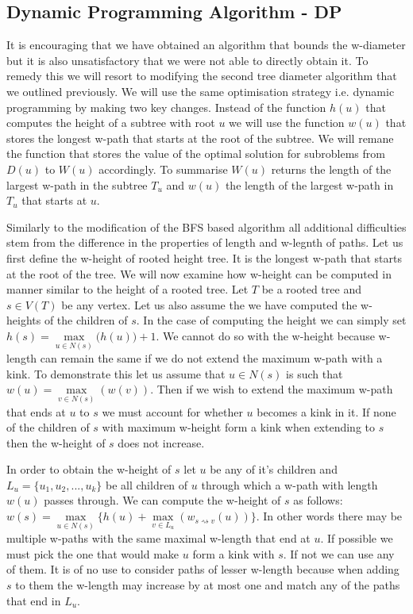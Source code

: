 \subsection{Dynamic Programming Algorithm - DP}


It is encouraging that we have obtained an algorithm that bounds the w-diameter but it is also unsatisfactory that we were not able to directly obtain it. To remedy this we will resort to modifying the second tree diameter algorithm that we outlined previously. We will use the same optimisation strategy i.e. dynamic programming by making two key changes. Instead of the function $h(u)$ that computes the height of a subtree with root $u$ we will use the function $w(u)$ that stores the longest w-path that starts at the root of the subtree. We will remane the function that stores the value of the optimal solution for subroblems from $D(u)$ to $W(u)$ accordingly. To summarise $W(u)$ returns the length of the largest w-path in the subtree $T_u$ and $w(u)$ the length of the largest w-path in $T_u$ that starts at $u$.

Similarly to the modification of the BFS based algorithm all additional difficulties stem from the difference in the properties of length and w-legnth of paths. Let us first define the w-height of rooted height tree. It is the longest w-path that starts at the root of the tree. We will now examine how w-height can be computed in manner similar to the height of a rooted tree. Let $T$ be a rooted tree and $s \in V(T)$ be any vertex. Let us also assume the we have computed the w-heights of the children of $s$. In the case of computing the height we can simply set $h(s) = \max\limits_{u \in N(s)}\big( h(u) \big) + 1$. We cannot do so with the w-height because w-length can remain the same if we do not extend the maximum w-path with a kink.  To demonstrate this let us assume that $u \in N(s)$ is such that $w(u) = \max\limits_{v \in N(s)}(w(v))$. Then if we wish to extend the maximum w-path that ends at $u$ to $s$ we must account for whether $u$ becomes a kink in it. If none of the children of $s$ with maximum w-height form a kink when extending to $s$ then the w-height of $s$ does not increase.

In order to obtain the w-height of $s$ let $u$ be any of it's children and $L_u = \{u_1, u_2, ..., u_k\}$ be all children of $u$ through which a w-path with length $w(u)$ passes through. We can compute the w-height of $s$ as follows: $w(s) = \max\limits_{u \in N(s)}\{ h(u) + \max\limits_{v \in L_u}(w_{s \rightsquigarrow v}(u)) \}$. In other words there may be multiple w-paths with the same maximal w-length that end at $u$. If possible we must pick the one that would make $u$ form a kink with $s$. If not we can use any of them. It is of no use to consider paths of lesser w-length because when adding $s$ to them the w-length may increase by at most one and match any of the paths that end in $L_u$.

